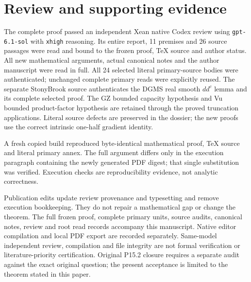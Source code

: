 \documentclass[
  11pt,
]{article}
\begin{document}
\section*{Review and supporting evidence}

The complete proof passed an independent Xean native Codex review using
\texttt{gpt-6.1-sol} with \texttt{xhigh} reasoning. Its entire report,
11 premises and 26 source passages were read and bound
to the frozen proof, TeX source and author status. All new mathematical
arguments, actual canonical notes and the author manuscript were read in
full. All 24 selected literal primary-source bodies were authenticated;
unchanged complete primary reads were explicitly reused. The separate
StonyBrook source authenticates the DGMS real smooth $dd^c$ lemma and its
complete selected proof. The GZ bounded capacity hypothesis and Vu bounded
product-factor hypothesis are retained through the proved truncation
applications. Literal source defects are preserved in the dossier; the
new proofs use the correct intrinsic one-half gradient identity.

A fresh copied build reproduced byte-identical mathematical proof,
TeX source and literal primary annex. The full argument differs only in
the execution paragraph containing the newly generated PDF digest; that
single substitution was verified. Execution checks are reproducibility
evidence, not analytic correctness.

Publication edits update review provenance and typesetting and remove
execution bookkeeping. They do not repair a mathematical gap or change
the theorem. The full frozen proof, complete primary units, source audits,
canonical notes, review and root read records accompany this manuscript.
Native editor compilation and local PDF export are recorded separately.
Same-model independent review, compilation and file integrity are not
formal verification or literature-priority certification. Original P15.2
closure requires a separate audit against the exact original question;
the present acceptance is limited to the theorem stated in this paper.
\end{document}
